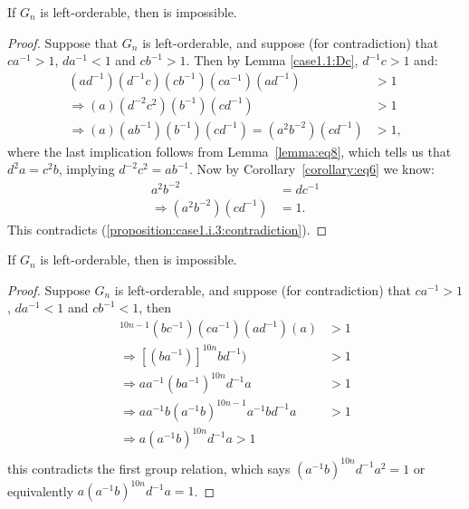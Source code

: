 \begin{proposition} If $G_n$ is left-orderable, then  is impossible.
\end{proposition}
\begin{proof} Suppose that $G_n$ is left-orderable, and suppose (for contradiction) that $ca^{-1}>1$, $da^{-1}<1$ and $cb^{-1}>1$. Then by Lemma \ref{case1.1:Dc}, $d^{-1}c>1$ and:
\begin{align}
(ad^{-1})(d^{-1}c)(cb^{-1})(ca^{-1})(ad^{-1})&>1\nonumber{}\\
\Rightarrow{}(a)(d^{-2}c^{2})(b^{-1})(cd^{-1})&>1\nonumber{}\\
\Rightarrow{}(a)(ab^{-1})(b^{-1})(cd^{-1})=(a^{2}b^{-2})(cd^{-1})&>1,\label{proposition:case1.i.3:contradiction}
\end{align}
where the last implication follows from Lemma~\ref{lemma:eq8}, which tells us that $d^{2}a=c^{2}b$, implying $d^{-2}c^{2}=ab^{-1}$. Now by Corollary~\ref{corollary:eq6} we know:
\begin{align*}
a^{2}b^{-2}&=dc^{-1}\\
\Rightarrow{}(a^{2}b^{-2})(cd^{-1})&=1.
\end{align*}
This contradicts (\ref{proposition:case1.i.3:contradiction}).
\end{proof}

\begin{proposition} If $G_n$ is left-orderable, then  is impossible.
\end{proposition}
\begin{proof} Suppose $G_n$ is left-orderable, and suppose (for contradiction) that $ca^{-1}>1$, $da^{-1}<1$ and $cb^{-1}<1$, then
\begin{align*}
[(bc^{-1})(ca^{-1})]^{10n-1}(bc^{-1})(ca^{-1})(ad^{-1})(a)&>1\\
\Rightarrow{}[(ba^{-1})]^{10n}bd^{-1})&>1\\
\Rightarrow{}aa^{-1}(ba^{-1})^{10n}d^{-1}a&>1\\
\Rightarrow{}aa^{-1}b(a^{-1}b)^{10n-1}a^{-1}bd^{-1}a&>1\\
\Rightarrow{}a(a^{-1}b)^{10n}d^{-1}a>1\\
\end{align*}
this contradicts the first group relation, which says $(a^{-1}b)^{10n}d^{-1}a^{2}=1$ or equivalently $a(a^{-1}b)^{10n}d^{-1}a=1$.
\end{proof}

